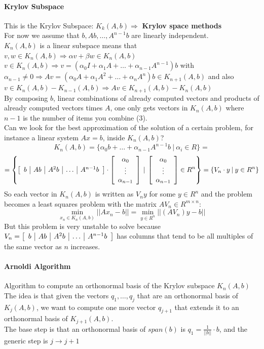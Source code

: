 \documentclass[10pt]{report}
\begin{document}
\paragraph{Krylov Subspace} This is the Krylov Subspace: $K_k(A,b)\Rightarrow$ \textbf{Krylov space methods}\\
For now we assume that $b, Ab, \ldots, A^{n-1}b$ are linearly independent.\\
$K_n(A,b)$ is a linear subspace means that $v,w\in K_n(A,b)\Rightarrow \alpha v+\beta w\in K_n(A,b)$\\
$v\in K_n(A,b)\Rightarrow v=(\alpha_0 I + \alpha_1 A + \ldots + \alpha_{n-1} A^{n-1})b$ with $\alpha_{n-1}\neq 0 \Rightarrow Av = (\alpha_0A + \alpha_1 A^2+\ldots + \alpha_n A^n)b \in K_{n+1}(A,b)$ and also $v\in K_n(A,b) - K_{n-1}(A,b)\Rightarrow Av \in K_{n+1}(A,b)- K_n(A,b)$\\
By composing $b$, linear combinations of already computed vectors and products of already computed vectors times $A$, one only gets vectors in $K_n(A,b)$ where $n-1$ is the number of items you combine (3).\\
Can we look for the best approximation of the solution of a certain problem, for instance a linear system $Ax=b$, inside $K_n(A,b)$?
$$K_n(A,b) = \{\alpha_0b+\ldots + \alpha_{n-1}A^{n-1}b\:|\:\alpha_i\in R\} =$$ $$= \left\{\left[\begin{array}{c | c | c | c | c}
b & Ab &A^2b & \ldots & A^{n-1}b
\end{array}\right]\cdot\left[\begin{array}{c}
\alpha_0\\\vdots\\\alpha_{n-1}
\end{array}\right]\:|\:\left[\begin{array}{c}
\alpha_0\\\vdots\\\alpha_{n-1}
\end{array}\right]\in R^n \right\} = \{V_n\cdot y\:|\:y \in R^n\}$$
So each vector in $K_n(A,b)$ is written as $V_ny$ for some $y\in R^n$ and the problem becomes a least squares problem with the matrix $AV_n\in R^{m\times n}$:
$$\min_{x_n\in K_n(A,b)} ||Ax_n - b|| = \min_{y\in R^n} ||(AV_n)y-b||$$
But this problem is very unstable to solve because $V_n = \left[\begin{array}{c | c | c | c | c}
b & Ab &A^2b & \ldots & A^{n-1}b
\end{array}\right]$ has columns that tend to be all multiples of the same vector as $n$ increases.
\paragraph{Arnoldi Algorithm} Algorithm to compute an orthonormal basis of the Krylov subspace $K_n(A,b)$\\
The idea is that given the vectors $q_1,\ldots,q_j$ that are an orthonormal basis of $K_j(A,b)$, we want to compute one more vector $q_{j+1}$ that extends it to an orthonormal basis of $K_{j+1}(A,b)$.\\
The base step is that an orthonormal basis of $span(b)$ is $q_1=\frac{1}{||b||}\cdot b$, and the generic step is $j\rightarrow j+1$ %
\end{document}
